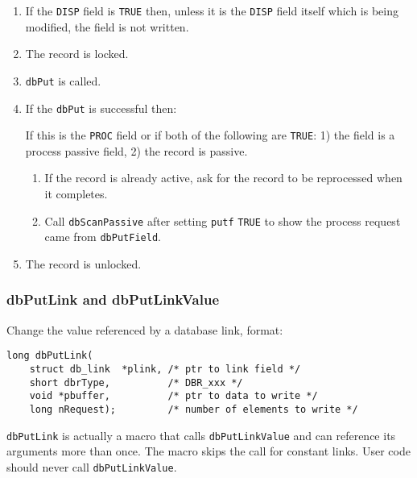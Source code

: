 \begin{enumerate}
\item If the \verb|DISP| field is \verb|TRUE| then, unless it is the \verb|DISP| field itself which is being modified, the field is not written.

\item The record is locked.

\item \verb|dbPut| is called.

\item If the \verb|dbPut| is successful then:

If this is the \verb|PROC| field or if both of the following are \verb|TRUE|:
1) the field is a process passive field,
2) the record is passive.

\begin{enumerate}

\item If the record is already active, ask for the record to be reprocessed when it completes.

\item Call \verb|dbScanPassive| after setting \verb|putf| \verb|TRUE| to show the process request came from \verb|dbPutField|.

\end{enumerate}

\item The record is unlocked.

\end{enumerate}

\subsubsection{dbPutLink and dbPutLinkValue}

Change the value referenced by a database link, format:

\begin{verbatim}
long dbPutLink(
    struct db_link  *plink, /* ptr to link field */
    short dbrType,          /* DBR_xxx */
    void *pbuffer,          /* ptr to data to write */
    long nRequest);         /* number of elements to write */
\end{verbatim}

\verb|dbPutLink| is actually a macro that calls \verb|dbPutLinkValue| and can reference its arguments more than once.
The macro skips the call for constant links.
User code should never call \verb|dbPutLinkValue|.

